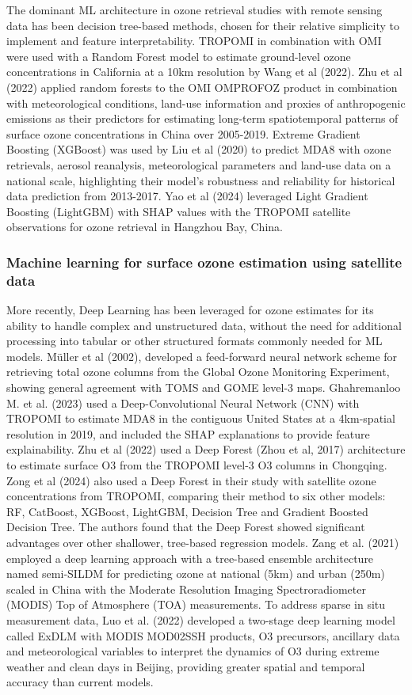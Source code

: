 \documentclass[gmd, manuscript]{copernicus}
\begin{document}
The dominant ML architecture in ozone retrieval studies with remote sensing data has been decision tree-based methods, chosen for their relative simplicity to implement and feature interpretability. TROPOMI in combination with OMI were used with a Random Forest model to estimate ground-level ozone concentrations in California at a 10km resolution by Wang et al (2022). Zhu et al (2022) applied random forests to the OMI OMPROFOZ product in combination with meteorological conditions, land-use information and proxies of anthropogenic emissions as their predictors for estimating long-term spatiotemporal patterns of surface ozone concentrations in China over 2005-2019. Extreme Gradient Boosting (XGBoost) was used by Liu et al (2020) to predict MDA8 with ozone retrievals, aerosol reanalysis, meteorological parameters and land-use data on a national scale, highlighting their model’s robustness and reliability for historical data prediction from 2013-2017. Yao et al (2024) leveraged Light Gradient Boosting (LightGBM) with SHAP values with the TROPOMI satellite observations for ozone retrieval in Hangzhou Bay, China.  
\subsubsection{Machine learning for surface ozone estimation using satellite data}
More recently, Deep Learning has been leveraged for ozone estimates for its ability to handle complex and unstructured data, without the need for additional processing into tabular or other structured formats commonly needed for ML models. Müller et al (2002), developed a feed-forward neural network scheme for retrieving total ozone columns from the Global Ozone Monitoring Experiment, showing general agreement with TOMS and GOME level-3 maps. Ghahremanloo M. et al. (2023) used a Deep-Convolutional Neural Network (CNN) with TROPOMI to estimate MDA8 in the contiguous United States at a 4km-spatial resolution in 2019, and included the SHAP explanations to provide feature explainability. Zhu et al (2022) used a Deep Forest (Zhou et al, 2017) architecture to estimate surface O3 from the TROPOMI level-3 O3 columns in Chongqing.  Zong et al (2024) also used a Deep Forest in their study with satellite ozone concentrations from TROPOMI, comparing their method to six other models: RF, CatBoost, XGBoost, LightGBM, Decision Tree and Gradient Boosted Decision Tree. The authors found that the Deep Forest showed significant advantages over other shallower, tree-based regression models. Zang et al. (2021) employed a deep learning approach with a tree-based ensemble architecture named semi-SILDM for predicting ozone at national (5km) and urban (250m) scaled in China with the Moderate Resolution Imaging Spectroradiometer (MODIS) Top of Atmosphere (TOA) measurements. To address sparse in situ measurement data, Luo et al. (2022) developed a two-stage deep learning model called ExDLM with MODIS MOD02SSH products, O3 precursors, ancillary data and meteorological variables to interpret the dynamics of O3 during extreme weather and clean days in Beijing, providing greater spatial and temporal accuracy than current models. 
\end{document}
